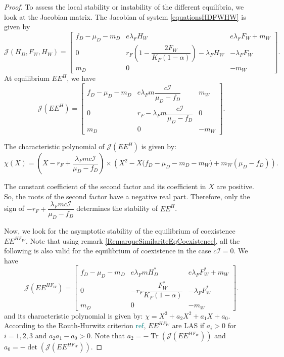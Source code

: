 \documentclass{article}
\newcommand{\lfw}{\lambda_{F}}
\newcommand{\lfw}{\lambda_{F}}
\newcommand{\marc}[1]{\textcolor{teal}{#1}}
\DeclareMathOperator{\Tr}{Tr}
\begin{document}
\begin{proof}
To assess the local stability or instability of the different equilibria, we look at the Jacobian matrix. The Jacobian of system \eqref{equationsHDFWHW} is given by
\begin{equation*}
\mathcal{J}(H_D, F_W, H_W) = \begin{bmatrix}
f_D-\mu_D - m_D & e \lfw H_W & e\lfw F_W + m_W \\
0 & r_F \left( 1 - \dfrac{2F_W}{K_F(1-\alpha)} \right) - \lfw H_W & - \lfw F_W \\
m_D & 0 & -m_W
\end{bmatrix}.
\end{equation*}
At equilibrium $EE^{H}$, we have
\begin{equation*}
\mathcal{J}(EE^{H}) = \begin{bmatrix}
f_D-\mu_D - m_D & e \lfw m \dfrac{c\mathcal{I}}{\mu_D - f_D} & m_W \\
0 & r_F - \lfw m \dfrac{c\mathcal{I}}{\mu_D - f_D} & 0 \\
m_D & 0 & -m_W
\end{bmatrix}.
\end{equation*}


The characteristic polynomial of $\mathcal{J}(EE^{H})$ is given by:
\begin{equation*}
\chi(X) = (X - r_F + \dfrac{\lfw m c\mathcal{I}}{\mu_D - f_D}) \times \left(X^2 - X\Big(f_D - \mu_D - m_D - m_W \Big) + m_W(\mu_D - f_D)\right).
\end{equation*}

The constant coefficient of the second factor and its coefficient in $X$ are positive. So, the roots of the second factor have a negative real part. Therefore, only the sign of $-r_F + \dfrac{\lfw m c\mathcal{I}}{\mu_D - f_D}$ determines the stability of $EE^{H}$.


\medskip
Now, we look for the asymptotic stability of the equilibrium of coexistence $EE^{HF_W}$. Note that using remark \ref{RemarqueSimilariteEqCoexistence}, all the following is also valid for the equilibrium of coexistence in the case $c\mathcal{I} = 0$. We have 
\begin{equation*}
\mathcal{J}(EE^{H F_W}) = \begin{bmatrix}
f_D -\mu_D - m_D & e \lfw m H_D^* & e \lfw F^*_W +m_W \\
0 & -r_F \dfrac{F_W^*}{K_F(1-\alpha)} & - \lfw F_W^* \\
m_D & 0 & -m_W
\end{bmatrix}.
\end{equation*} and its characteristic polynomial is given by: $\chi = X^3 + a_2 X^2 + a_1 X + a_0$. According to the Routh-Hurwitz criterion \marc{ref}, $EE^{H F_W}$ are LAS if $a_i > 0$ for $i=1,2,3$ and $a_2 a_1 - a_0 > 0$. Note that $a_2 = - \Tr(\mathcal{J}(EE^{H F_W}))$ and $a_0 = - \det (\mathcal{J}(EE^{H F_W}))$.


\end{proof}
\end{document}
